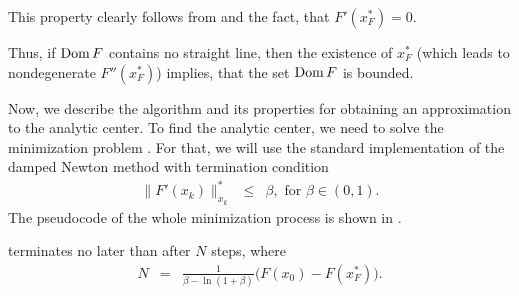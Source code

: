 This property clearly follows from  and the fact, that $F'(x^*_F) = 0$.

Thus, if $\operatorname{Dom} F$ contains no straight line, then the existence of $x^*_F$ (which leads to nondegenerate $F''(x^*_F)$) implies, that the set $\operatorname{Dom} F$ is bounded.

Now, we describe the algorithm and its properties for obtaining an approximation to the analytic center.
To find the analytic center, we need to solve the minimization problem .
For that, we will use the standard implementation of the damped Newton method with termination condition
\begin{eqnarray}
  \|F'(x_k)\|^*_{x_k} &\leq& \beta, \text{ for } \beta\in(0,1).
\end{eqnarray}
The pseudocode of the whole minimization process is shown in .



\begin{theorem}
   terminates no later than after $N$ steps, where
  \begin{eqnarray}
    N &=& \frac{1}{\beta - \ln(1+\beta)}\big(F(x_0) - F(x^*_F)\big).
  \end{eqnarray}
\end{theorem}

